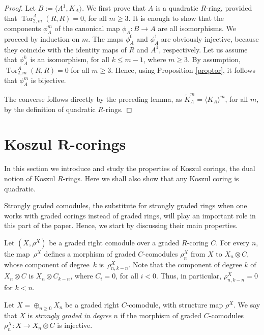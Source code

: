 \documentclass[pdftex]{sigma}
\newcommand\ot{\otimes}
\newcommand{\gen}[1]{\langle #1 \rangle}
\renewcommand{\^}[1]{\mbox{$^{\left( #1 \right)}$}}
\renewcommand{\_}[1]{\mbox{$_{\left( #1 \right)}$}}
\numberwithin{equation}{section}
\begin{document}
\begin{proof}
Let $B:=\langle A^1,K_A\rangle$. We f\/irst prove that $A$ is a quadratic $R$-ring, provided that $\operatorname{Tor}_{2,m}^A(R,R)=0$, for all $m \geq 3$. It is enough to show that the components $\phi_A^m$ of the canonical map $\phi_A\colon B \rightarrow A$ are all isomorphisms. We proceed by induction on $m$. The maps $\phi_A^0$ and $\phi^1_A$ are obviously injective, because they coincide with the identity maps of $R$ and $A^1$, respectively. Let us assume that $\phi^k_A$ is an isomorphism, for all $k \leq m-1$, where $m\geq 3$. By assumption, $\operatorname{Tor}_{2,m}^A(R,R)=0$ for all $m\geq 3$. Hence, using Proposition \ref{proptor}, it follows that $\phi_A^m$ is bijective.

The converse follows directly by the preceding lemma, as $\widetilde{K}_A^m = \gen{K_A}^m$, for all $m$, by the def\/inition of quadratic $R$-rings.
\end{proof}

\section[Koszul $R$-corings]{Koszul $\boldsymbol{R}$-corings}\label{section4}

In this section we introduce and study the properties of Koszul corings, the dual notion of Koszul $R$-rings. Here we shall also show that any Koszul coring is quadratic.

Strongly graded comodules, the substitute for strongly graded rings when one works with graded corings instead of graded rings, will play an important role in this part of the paper. Hence, we start by discussing their main properties.

Let $(X,\rho^X)$ be a graded right comodule over a graded $R$-coring $C$. For every $n$, the map~$\rho^X$ def\/ines a morphism of graded $C$-comodules $\rho_n^X$ from $X$ to $X_n\ot C$, whose component of degree~$k$ is~$\rho_{n,k-n}^X$. Note that the component of degree $k$ of $X_n\ot C$ is $X_n\ot C_{k-n}$, where $C_i=0$, for all $i<0$. Thus, in particular, $\rho_{n,k-n}^X=0$ for $k<n$.

\begin{Definition}\label{de:strongly_graded_n}
Let $X=\oplus_{n\geq 0} X_n$ be a graded right $C$-comodule, with structure map $\rho^X$. We say that $X$ is \emph{strongly graded in degree} $n$ if the morphism of graded $C$-comodules $\rho^X_{n} \colon X \rightarrow X_n \otimes C$ is injective.
\end{Definition}
\end{document}
